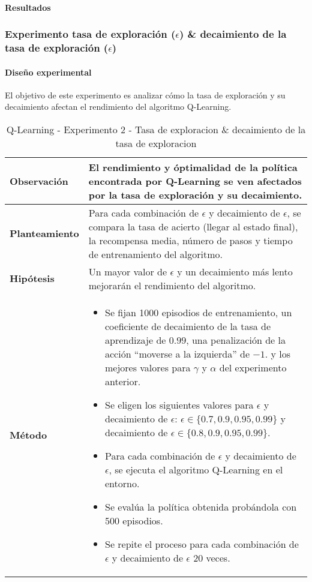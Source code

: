 \paragraph{Resultados}

\subsubsection{Experimento tasa de exploración (\(\epsilon\)) \& decaimiento de la tasa de exploración (\(\epsilon\))}

\paragraph{Diseño experimental}
El objetivo de este experimento es analizar cómo la tasa de exploración y su decaimiento afectan el rendimiento del algoritmo Q-Learning.

\begin{table}[H]
    \centering
    \begin{tabularx}{\textwidth}{|p{4cm}|X|} %
        \hline %
        \textbf{Observación} & El rendimiento y óptimalidad de la política encontrada por Q-Learning se ven afectados por la tasa de exploración y su decaimiento. 
        \\ \hline 
        \textbf{Planteamiento} & Para cada combinación de \(\epsilon\) y decaimiento de \(\epsilon\), se compara la tasa de acierto (llegar al estado final), la recompensa media, número de pasos y tiempo de entrenamiento del algoritmo.
        \\ \hline 
        \textbf{Hipótesis} & Un mayor valor de \(\epsilon\) y un decaimiento más lento mejorarán el rendimiento del algoritmo.
        \\ \hline 
        \textbf{Método} & 
        \begin{itemize}
            \item Se fijan 1000 episodios de entrenamiento,  un coeficiente de decaimiento de la tasa de aprendizaje de $0.99$, una penalización de la acción ``moverse a la izquierda'' de $-1$. y los mejores valores para \(\gamma\) y $\alpha$ del experimento anterior.
            \item Se eligen los siguientes valores para \(\epsilon\) y decaimiento de \(\epsilon\): \(\epsilon \in \{0.7, 0.9, 0.95, 0.99\}\) y decaimiento de \(\epsilon \in \{0.8, 0.9, 0.95, 0.99\}\).
            \item Para cada combinación de \(\epsilon\) y decaimiento de \(\epsilon\), se ejecuta el algoritmo Q-Learning en el entorno.
            \item Se evalúa la política obtenida probándola con 500 episodios.
            \item Se repite el proceso para cada combinación de \(\epsilon\) y decaimiento de \(\epsilon\) 20 veces.
        \end{itemize}
        \\ \hline
    \end{tabularx}
    \caption{Q-Learning - Experimento 2 - Tasa de exploracion \& decaimiento de la tasa de exploracion}
    \label{tab:diseñoQLEarningExp2}
\end{table}

